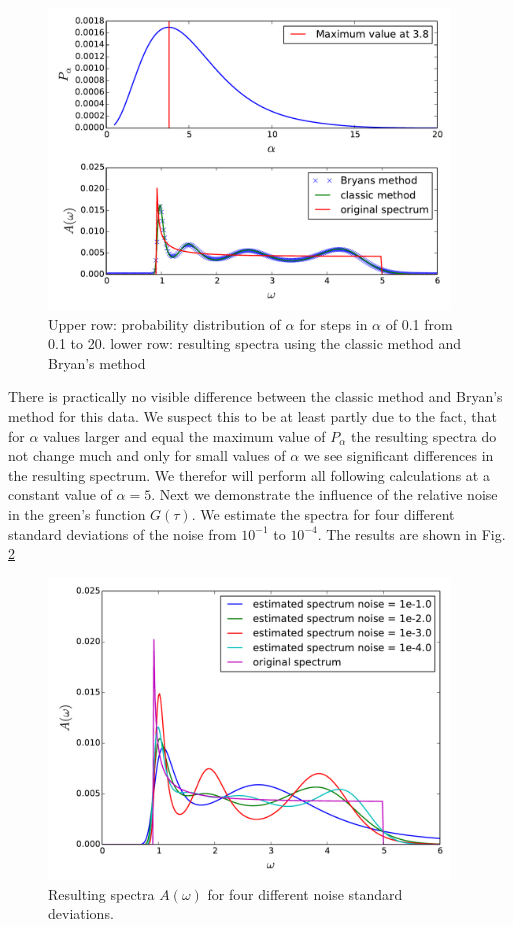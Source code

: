 \begin{figure}[htbp]
	\centering
	\includegraphics[width=0.95\textwidth]{./images/BCS_Bryan_classic_p_alpha.pdf}
	\caption{Upper row: probability distribution of $\alpha$ for steps in $\alpha$ of 0.1 from 0.1 to 20. lower row: resulting spectra using the classic method and Bryan's method}
	\label{results:fig.4}
\end{figure}
\FloatBarrier
There is practically no visible difference between the classic method and Bryan's method for this data. We suspect this to be at least partly due to the fact, that for $\alpha$ values larger and equal the maximum value of $P_{\alpha}$ the resulting spectra do not change much and only for small values of $\alpha$ we see significant differences in the resulting spectrum. We therefor will perform all following calculations at a constant value of $\alpha = 5$.\newline
Next we demonstrate the influence of the relative noise in the green's function $G(\tau)$. We estimate the spectra for four different standard deviations of the noise from $10^{-1}$ to $10^{-4}$. The results are shown in Fig. \ref{results:fig_5}
\begin{figure}[htbp]
	\centering
	\includegraphics[width=0.95\textwidth]{./images/BCS_varying_noise.pdf}
	\caption{Resulting spectra $A(\omega)$ for four different noise standard deviations.}
	\label{results:fig_5}
\end{figure}

